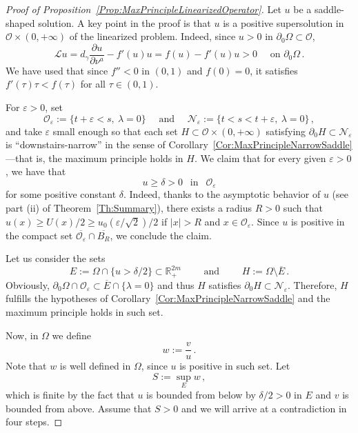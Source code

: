 \documentclass[12pt,reqno]{amsart}
\theoremstyle{definition}
\theoremstyle{remark}
\newcommand{\con}[1]{\mathbb{#1}}
\newcommand{\R}{\con{R}} %
\newcommand{\ocal}{\mathcal{O}}
\newcommand{\s}{\gamma}
\numberwithin{equation}{section}
\begin{document}
\begin{proof}[Proof of Proposition~\ref{Prop:MaxPrincipleLinearizedOperator}]
Let $u$ be a saddle-shaped solution. A key point in the proof is that $u$ is a positive supersolution in $\ocal\times(0,+\infty)$ of the linearized problem. Indeed, since $u>0$ in $\partial_0\Omega \subset \ocal$,
\begin{equation}
\label{Eq:uSupersolLinearized}
\mathscr{L}u = d_\s \dfrac{\partial u}{\partial \nu^a}  -f'(u) u = f(u) - f'(u) u > 0\quad \text{ on } \partial_0\Omega \,.
\end{equation}
We have used that since $f''<0$ in $(0,1)$ and $f(0)=0$, it satisfies $f'(\tau)\tau < f(\tau)$ for all $\tau\in (0,1)$.

For $\varepsilon > 0$, set
$$
\ocal_\varepsilon := \{t +\varepsilon < s,\ \lambda = 0 \} \quad \textrm{ and } \quad \mathcal{N}_\varepsilon := \{t < s < t+\varepsilon ,\ \lambda = 0 \}\,,
$$
and take $\varepsilon$ small enough so that each set $H \subset \ocal \times (0,+\infty)$ satisfying $\partial_0 H \subset \mathcal{N}_\varepsilon$  is ``downstairs-narrow'' in the sense of Corollary~\ref{Cor:MaxPrincipleNarrowSaddle} ---that is, the maximum principle holds in $H$. We claim that for every given $\varepsilon>0$, we have that
$$u \geq \delta >0\ \ \text{ in } \ \  \ocal_\varepsilon$$
for some positive constant $\delta$. Indeed, thanks to the asymptotic behavior of $u$ (see part (ii) of Theorem~\ref{Th:Summary}), there exists a radius $R>0$ such that $u(x) \geq U(x)/2 \geq u_0(\varepsilon/\sqrt{2})/2$ if $|x|>R$ and $x\in \ocal_\varepsilon$. Since $u$ is positive in the compact set $\overline{\ocal_\varepsilon} \cap \overline{B_R}$, we conclude the claim.

Let us consider the sets 
$$
E :=\Omega  \cap \{u > \delta/2\} \subset \R^{2m}_+ \qquad \textrm{ and } \qquad H := \Omega \setminus \overline{E}\,.
$$
Obviously, $\partial_0 \Omega \cap \ocal_\varepsilon \subset \overline{E} \cap \{\lambda = 0\}$ and thus $H$ satisfies $ \partial_0 H \subset \mathcal{N}_\varepsilon$. Therefore, $H$ fulfills the hypotheses of Corollary~\ref{Cor:MaxPrincipleNarrowSaddle} and the maximum principle holds in such set.


Now, in $\Omega$ we define
$$
w := \dfrac{v}{u}\,.
$$
Note that $w$ is well defined in $\Omega$, since $u$ is positive in such set. Let
$$
S := \sup_E w\,,
$$
which is finite by the fact that $u$ is bounded from below  by $\delta/2>0$ in $E$ and $v$ is bounded from above. Assume that $S > 0$ and we will arrive at a contradiction in four steps.


\end{proof}
\end{document}
